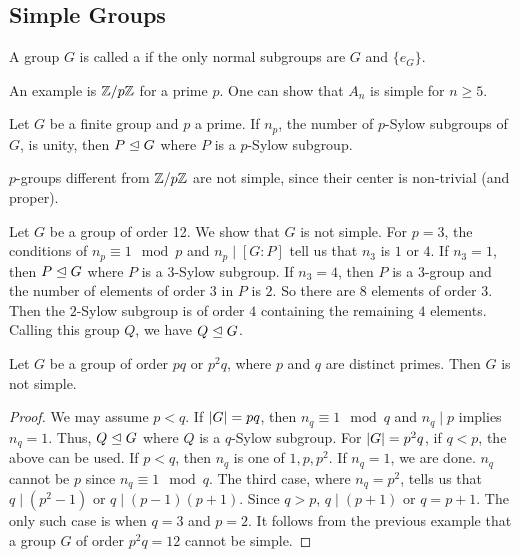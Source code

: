 \subsection{Simple Groups}
\begin{definition}
    A group $G$ is called a  if the only normal subgroups are $G$ and $\{e_{G}\}$.
\end{definition}

An example is $\mathbb{Z}/p\mathbb{Z}$ for a prime $p$. One can show that $A_{n}$ is simple for $n \geq 5$.

\begin{corollary}
    Let $G$ be a finite group and $p$ a prime. If $n_{p}$, the number of $p$-Sylow subgroups of $G$, is unity, then $P \trianglelefteq G$ where $P$ is a $p$-Sylow subgroup.
\end{corollary}
$p$-groups different from $\mathbb{Z}/p\mathbb{Z}$ are not simple, since their center is non-trivial (and proper).

\begin{example}
    Let $G$ be a group of order 12. We show that $G$ is not simple. For $p = 3$, the conditions of $n_{p} \equiv 1 \mod p$ and $n_{p} \mid [G:P]$ tell us that $n_{3}$ is $1$ or $4$. If $n_{3} = 1$, then $P \trianglelefteq G$ where $P$ is a $3$-Sylow subgroup. If $n_{3} = 4$, then $P$ is a $3$-group and the number of elements of order $3$ in $P$ is $2$. So there are $8$ elements of order $3$. Then the $2$-Sylow subgroup is of order $4$ containing the remaining $4$ elements. Calling this group $Q$, we have $Q \trianglelefteq G$.
\end{example}


\begin{proposition}
    Let $G$ be a group of order $pq$ or $p^{2}q$, where $p$ and $q$ are distinct primes. Then $G$ is not simple.
\end{proposition}
\begin{proof}
    We may assume $p < q$. If $\left| G \right| = pq$, then $n_{q} \equiv 1 \mod q$ and $n_{q} \mid p$ implies $n_{q} = 1$. Thus, $Q \trianglelefteq G$ where $Q$ is a $q$-Sylow subgroup. For $\left| G \right| = p^{2}q$, if $q < p$, the above can be used. If $p < q$, then $n_{q}$ is one of $1,p,p^{2}$. If $n_{q} = 1$, we are done. $n_{q}$ cannot be $p$ since $n_{q} \equiv 1 \mod q$. The third case, where $n_{q} = p^{2}$, tells us that $q \mid (p^{2}-1)$ or $q \mid (p-1)(p+1)$. Since $q > p$, $q \mid (p+1)$ or $q = p+1$. The only such case is when $q = 3$ and $p = 2$. It follows from the previous example that a group $G$ of order $p^{2}q = 12$ cannot be simple.
\end{proof}

